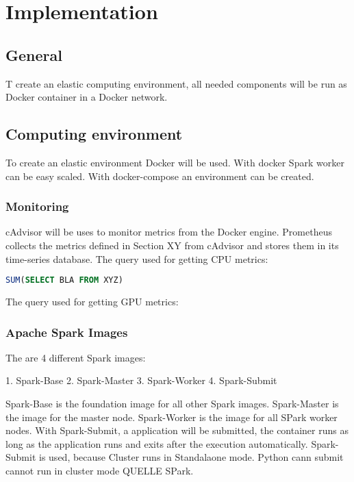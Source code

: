 \chapter{Implementation}
\label{sec:implementation}
%

\section{General}
T create an elastic computing environment, all needed components will be run as Docker container in a Docker network.


\section{Computing environment}
To create an elastic environment Docker will be used. With docker Spark worker can be easy scaled. With docker-compose an environment can be created.
\subsection{Monitoring}
cAdvisor will be uses to monitor metrics from the Docker engine. Prometheus collects the metrics defined in Section XY from cAdvisor and stores them in its time-series database.
The query used for getting CPU metrics:

\begin{lstlisting}[language=SQL, caption=Python example]
SUM(SELECT BLA FROM XYZ)
\end{lstlisting}

The query used for getting GPU metrics:


\subsection{Apache Spark Images}
The are 4 different Spark images:

1. Spark-Base
2. Spark-Master
3. Spark-Worker
4. Spark-Submit

Spark-Base is the foundation image for all other Spark images. Spark-Master is the image for the master node. Spark-Worker is the image for all SPark worker nodes. With Spark-Submit, a application will be submitted, the container runs as long as the application runs and exits after the execution automatically. Spark-Submit is used, because Cluster runs in Standalaone mode. Python cann submit cannot run in cluster mode QUELLE SPark.

